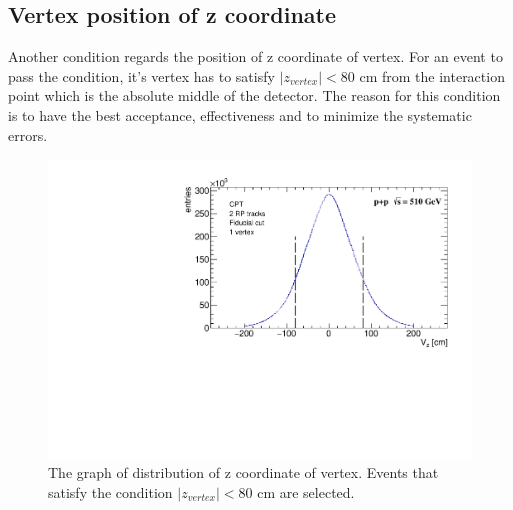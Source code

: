 \subsection{Vertex position of z coordinate}
 Another condition regards the position of z coordinate of vertex. For an event to pass the condition, it's vertex has to satisfy $|z_{vertex}| < 80$ cm from the interaction point which is the absolute middle of the detector. The reason for this condition is to have the best acceptance, effectiveness and 
to minimize the systematic errors.
\FloatBarrier
\begin{figure}[ht]
    \centering
    \includegraphics[width=1\textwidth]{figures/hPosZ.pdf}
    \caption[Distribution of z coordinate position of vertex]{The graph of distribution of z coordinate of vertex. Events that satisfy the condition $|z_{vertex}| < 80$ cm are selected.}
    \label{af5}
\end{figure}
\FloatBarrier
